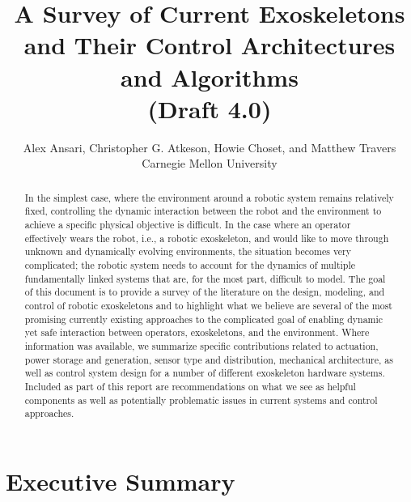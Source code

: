 \documentclass[letterpaper,12pt,fullpage]{article}
\begin{document}
\title{A Survey of Current Exoskeletons\\ and Their Control Architectures and
Algorithms\\
(Draft 4.0)}

\author{Alex Ansari, Christopher G. Atkeson, Howie Choset, and Matthew Travers\\
Carnegie Mellon University}

\maketitle

\begin{abstract}
In the simplest case, where the environment around a robotic system remains relatively fixed, controlling the dynamic interaction between the robot and the environment to achieve a specific physical objective is difficult.  In the case where an operator effectively wears the robot, i.e., a robotic exoskeleton, and would like to move through unknown and dynamically evolving environments, the situation becomes very complicated; the robotic system needs to account for the dynamics of multiple fundamentally linked systems that are, for the most part, difficult to model.  The goal of this document is to provide a survey of the literature on the design, modeling, and control of robotic exoskeletons and to highlight what we believe are several of the most promising currently existing approaches to the complicated goal of enabling dynamic yet safe interaction between operators, exoskeletons, and the environment.  Where information was available, we summarize specific contributions related to actuation, power storage and generation, sensor type and distribution, mechanical architecture, as well as control system design for a number of different exoskeleton hardware systems.  Included as part of this report are recommendations on what we see as helpful components as well as potentially problematic issues in current systems and control approaches. 
\end{abstract}

\section{Executive Summary}
\end{document}
